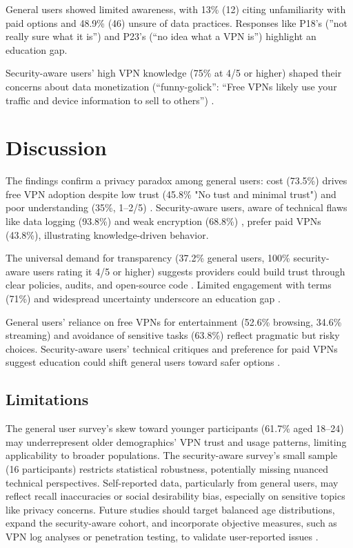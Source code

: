 \documentclass[11pt,a4paper]{article}
\begin{document}
General users showed limited awareness, with 13\% (12) citing unfamiliarity with paid options and 48.9\% (46) unsure of data practices. Responses like P18’s (''not really sure what it is'') and P23’s (``no idea what a VPN is'') highlight an education gap.

Security-aware users’ high VPN knowledge (75\% at 4/5 or higher) shaped their concerns about data monetization (``funny-golick'': ``Free VPNs likely use your traffic and device information to sell to others'') \citep{Shetty2025}.

\section{Discussion}
The findings confirm a privacy paradox among general users: cost (73.5\%) drives free VPN adoption despite low trust (45.8\% "No tust and minimal trust") and poor understanding (35\%, 1--2/5) \citep{Story2021, Namara2020}. Security-aware users, aware of technical flaws like data logging (93.8\%) and weak encryption (68.8\%) \citep{Khan2018, Ramesh2022, Shetty2025}, prefer paid VPNs (43.8\%), illustrating knowledge-driven behavior.

The universal demand for transparency (37.2\% general users, 100\% security-aware users rating it 4/5 or higher) suggests providers could build trust through clear policies, audits, and open-source code \citep{Blancaflor2024, Abbas2023}. Limited engagement with terms (71\%) and widespread uncertainty underscore an education gap \citep{PriyankaP15, Story2021}.

General users’ reliance on free VPNs for entertainment (52.6\% browsing, 34.6\% streaming) and avoidance of sensitive tasks (63.8\%) reflect pragmatic but risky choices. Security-aware users’ technical critiques and preference for paid VPNs suggest education could shift general users toward safer options \citep{Sombatruang2020, Singh2016}.

\subsection{Limitations}

The general user survey’s skew toward younger participants (61.7\% aged 18--24) may underrepresent older demographics’ VPN trust and usage patterns, limiting applicability to broader populations. The security-aware survey’s small sample (16 participants) restricts statistical robustness, potentially missing nuanced technical perspectives. Self-reported data, particularly from general users, may reflect recall inaccuracies or social desirability bias, especially on sensitive topics like privacy concerns. Future studies should target balanced age distributions, expand the security-aware cohort, and incorporate objective measures, such as VPN log analyses or penetration testing, to validate user-reported issues \citep{Ramesh2022, Wilson2020}.
\end{document}
